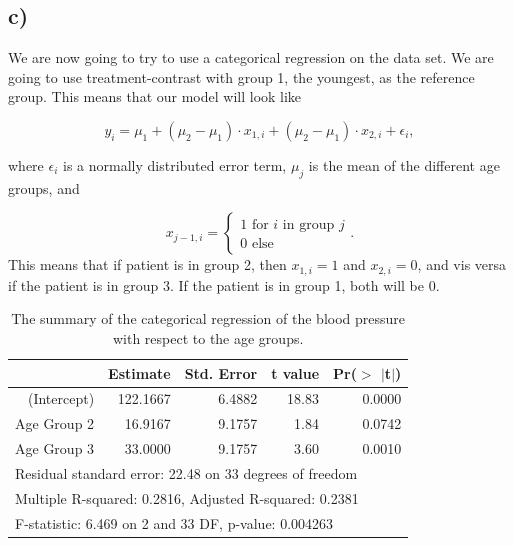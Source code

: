 \documentclass[a4paper,norsk, 10pt]{article}
\begin{document}
\subsection*{c)}

We are now going to try to use a categorical regression on the data set. We are going to use treatment-contrast with group 1, the youngest, as the reference group. This means that our model will look like

\begin{equation}
y_i = \mu_1 + (\mu_2-\mu_1)\cdot x_{1,i} + (\mu_2-\mu_1)\cdot x_{2,i} + \epsilon_i,
\end{equation}

where $\epsilon_i$ is a normally distributed error term, $\mu_j$ is the mean of the different age groups, and

\begin{equation}
x_{j-1,i} = 
\begin{cases}
1 \text{	for $i$ in group $j$} \\
0 \text{	else}
\end{cases}.
\end{equation}
This means that if patient is in group 2, then $x_{1,i} = 1$ and $x_{2,i} = 0$, and vis versa if the patient is in group 3. If the patient is in group 1, both will be $0$.

\begin{table}[!htbp]
\centering
\begin{tabular}{rrrrr}
  \hline
 & Estimate & Std. Error & t value & Pr($>$ $|$t$|$) \\ 
  \hline
(Intercept) & 122.1667 & 6.4882 & 18.83 & 0.0000 \\ 
  Age Group 2 & 16.9167 & 9.1757 & 1.84 & 0.0742 \\ 
  Age Group 3 & 33.0000 & 9.1757 & 3.60 & 0.0010 \\ 
  \hline
   \multicolumn{5}{l}{Residual standard error: 22.48 on 33 degrees of freedom} \\
	\multicolumn{5}{l}{Multiple R-squared:  0.2816,	Adjusted R-squared:  0.2381} \\
	\multicolumn{5}{l}{F-statistic: 6.469 on 2 and 33 DF,  p-value: 0.004263} \\
   \hline
\end{tabular}
\caption{The summary of the categorical regression of the blood pressure with respect to the age groups.}\label{tab:blood_reg}
\end{table}
\end{document}
